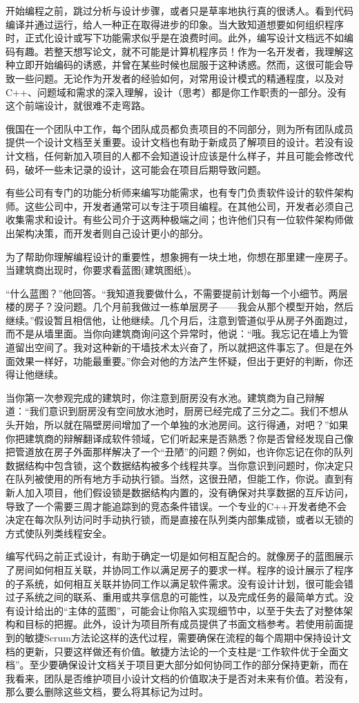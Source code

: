 开始编程之前，跳过分析与设计步骤，或者只是草率地执行真的很诱人。看到代码编译并通过运行，给人一种正在取得进步的印象。当大致知道想要如何组织程序时，正式化设计或写下功能需求似乎是在浪费时间。此外，编写设计文档远不如编码有趣。若整天想写论文，就不可能是计算机程序员！作为一名开发者，我理解这种立即开始编码的诱惑，并曾在某些时候也屈服于这种诱惑。然而，这很可能会导致一些问题。无论作为开发者的经验如何，对常用设计模式的精通程度，以及对C++、问题域和需求的深入理解，设计（思考）都是你工作职责的一部分。没有这个前端设计，就很难不走弯路。

俄国在一个团队中工作，每个团队成员都负责项目的不同部分，则为所有团队成员提供一个设计文档至关重要。设计文档也有助于新成员了解项目的设计。若没有设计文档，任何新加入项目的人都不会知道设计应该是什么样子，并且可能会修改代码，破坏一些未记录的设计，这可能会在项目后期导致问题。

有些公司有专门的功能分析师来编写功能需求，也有专门负责软件设计的软件架构师。这些公司中，开发者通常可以专注于项目编程。在其他公司，开发者必须自己收集需求和设计。有些公司介于这两种极端之间；也许他们只有一位软件架构师做出架构决策，而开发者则自己设计更小的部分。

为了帮助你理解编程设计的重要性，想象拥有一块土地，你想在那里建一座房子。当建筑商出现时，你要求看蓝图(建筑图纸)。

“什么蓝图？”他回答。“我知道我要做什么，不需要提前计划每一个小细节。两层楼的房子？没问题。几个月前我做过一栋单层房子——我会从那个模型开始，然后继续。”假设暂且相信他，让他继续。几个月后，注意到管道似乎从房子外面跑过，而不是从墙里面。当你向建筑商询问这个异常时，他说：“哦。我忘记在墙上为管道留出空间了。我对这种新的干墙技术太兴奋了，所以就把这件事忘了。但是在外面效果一样好，功能最重要。”你会对他的方法产生怀疑，但出于更好的判断，你还得让他继续。

当你第一次参观完成的建筑时，你注意到厨房没有水池。建筑商为自己辩解道：“我们意识到厨房没有空间放水池时，厨房已经完成了三分之二。我们不想从头开始，所以就在隔壁房间增加了一个单独的水池房间。这行得通，对吧？”如果你把建筑商的辩解翻译成软件领域，它们听起来是否熟悉？你是否曾经发现自己像把管道放在房子外面那样解决了一个“丑陋”的问题？例如，也许你忘记在你的队列数据结构中包含锁，这个数据结构被多个线程共享。当你意识到问题时，你决定只在队列被使用的所有地方手动执行锁。当然，这很丑陋，但能工作，你说。直到有新人加入项目，他们假设锁是数据结构内置的，没有确保对共享数据的互斥访问，导致了一个需要三周才能追踪到的竞态条件错误。一个专业的C++开发者绝不会决定在每次队列访问时手动执行锁，而是直接在队列类内部集成锁，或者以无锁的方式使队列类线程安全。

编写代码之前正式设计，有助于确定一切是如何相互配合的。就像房子的蓝图展示了房间如何相互关联，并协同工作以满足房子的要求一样。程序的设计展示了程序的子系统，如何相互关联并协同工作以满足软件需求。没有设计计划，很可能会错过子系统之间的联系、重用或共享信息的可能性，以及完成任务的最简单方式。没有设计给出的“主体的蓝图”，可能会让你陷入实现细节中，以至于失去了对整体架构和目标的把握。此外，设计为项目所有成员提供了书面文档参考。若使用前面提到的敏捷Scrum方法论这样的迭代过程，需要确保在流程的每个周期中保持设计文档的更新，只要这样做还有价值。敏捷方法论的一个支柱是“工作软件优于全面文档”。至少要确保设计文档关于项目更大部分如何协同工作的部分保持更新，而在我看来，团队是否维护项目小设计文档的价值取决于是否对未来有价值。若没有，那么要么删除这些文档，要么将其标记为过时。

